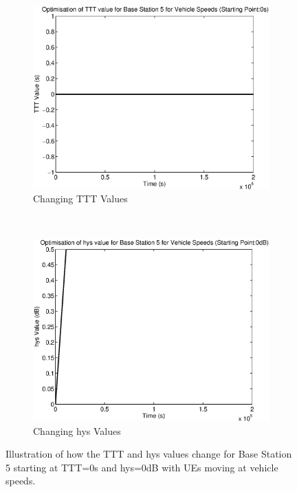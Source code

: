 \begin{figure}[H]
        \centering
        \begin{subfigure}[b]{0.49\textwidth}
                \includegraphics[width=\textwidth]{figures/graphs/vehlow/TTT5.eps}
                \caption{Changing TTT Values}
        \end{subfigure}%
        ~ %
        \begin{subfigure}[b]{0.49\textwidth}
                \includegraphics[width=\textwidth]{figures/graphs/vehlow/hys5.eps}
                \caption{Changing hys Values}
        \end{subfigure}
        \caption{Illustration of how the TTT and hys values change for Base Station 5 starting at TTT=0s and hys=0dB with UEs moving at vehicle speeds.}
\end{figure}
